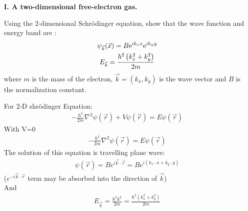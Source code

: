 \documentclass[answers]{exam}
\begin{document}
\textbf{I. A two-dimensional free-electron gas.}
\vspace{5mm}
\begin{questions}
\question Using the 2-dimensional Schr\"odinger equation, show that the wave function and energy band are :
\begin{gather*}
\psi_{\vec{k}}(\vec{x}) =B \mathrm{e}^{i k_{x} x} \mathrm{e}^{i k_{y} y}\notag \\
E_{\vec{k}} =\frac{\hbar^{2}\left(k_{x}^{2}+k_{y}^{2}\right)}{2 m}\notag   
\end{gather*}
where $m$ is the mass of the electron, $\vec{k} = (k_{x}, k_{y})$ is the wave vector and $B$ is the normalization constant.
\begin{solution}
For  2-D  shr\"odinger Equation:
\begin{align*}
-\frac{\hbar^{2}}{2 m} \nabla^{2} \psi(\vec{r})+V \psi(\vec{r})=E \psi(\vec{r})
\end{align*}
With  V=0 
\begin{align*}
-\frac{\hbar^{2}}{2 m} \nabla^{2} \psi(\vec{r})=E \psi(\vec{r})
\end{align*}
The solution of this equation is travelling plane wave:
\begin{align*}
\psi(\vec{r})=B e^{i \vec{k} \cdot \vec{r}}=B e^{i\left(k_{x} \cdot x+k_{y} \cdot y\right)}
\end{align*}
($e^{-i \vec{k} \cdot \vec{r}}$ term may be absorbed into the direction of $\vec{k}$)\\
And
\begin{align*}
E_{\vec{k}}=\frac{\hbar^{2} k^{2}}{2 m}=\frac{\hbar^{2}\left(k_{x}^{2}+k_{y}^{2}\right)}{2 m}
\end{align*}
\end{solution}


\end{questions}
\end{document}
